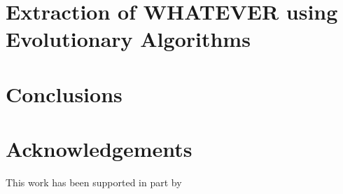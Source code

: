 \documentclass[runningheads]{llncs}
\begin{document}
\section{Extraction of WHATEVER using Evolutionary Algorithms}

\section{Conclusions}
\label{sec:conclusion}

\section*{Acknowledgements}
This work has been supported in part by %



\end{document}
